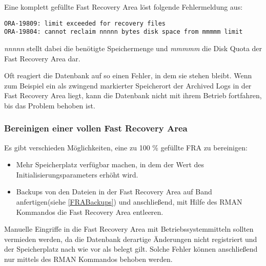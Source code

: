           Eine komplett gef\"ullte Fast Recovery Area l\"ost folgende Fehlermeldung aus:
          \begin{lstlisting}[caption={100\% gef\"ullte Fast Recovery Area},label=admin1040,language=terminal]
ORA-19809: limit exceeded for recovery files
ORA-19804: cannot reclaim nnnnn bytes disk space from mmmmm limit
          \end{lstlisting}
          \textit{nnnnn} stellt dabei die ben\"otigte Speichermenge und \textit{mmmmm} die Disk Quota der Fast Recovery Area dar.

          Oft reagiert die Datenbank auf so einen Fehler, in dem sie stehen bleibt. Wenn zum Beispiel ein als zwingend markierter Speicherort der Archived Logs in der Fast Recovery Area liegt, kann die Datenbank nicht mit ihrem Betrieb fortfahren, bis das Problem behoben ist.
        \subsubsection{Bereinigen einer vollen Fast Recovery Area}
          Es gibt verschieden M\"oglichkeiten, eine zu 100 \% gef\"ullte FRA zu bereinigen:
          \begin{itemize}
            \item Mehr Speicherplatz verf\"ugbar machen, in dem der Wert des Initialisierungsparameters  erh\"oht wird.
            \item Backups von den Dateien in der Fast Recovery Area auf Band anfertigen(siehe \ref{FRABackups}) und anschlie\ss{}end, mit Hilfe des RMAN Kommandos  die Fast Recovery Area entleeren.
          \end{itemize}
          \begin{merke}
            Manuelle Eingriffe in die Fast Recovery Area mit Betriebssystemmitteln sollten vermieden werden, da die Datenbank derartige \"Anderungen nicht registriert und der Speicherplatz nach wie vor als belegt gilt. Solche Fehler k\"onnen anschlie\ss{}end nur mittels des RMAN Kommandos  behoben werden.
          \end{merke}
